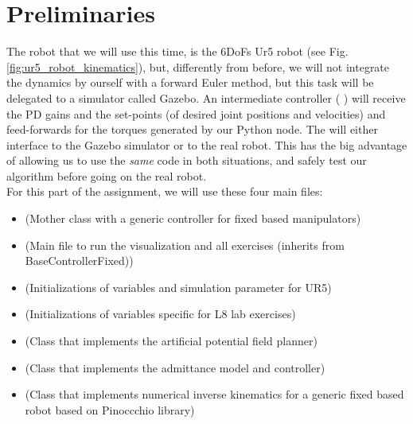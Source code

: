 \documentclass[11pt]{article}
\begin{document}
\section{Preliminaries}
	The robot that we will use this time, is the  6DoFs Ur5 robot (see Fig. \ref{fig:ur5_robot_kinematics}), but, differently from before, we will not integrate the dynamics by ourself with a forward Euler method,  but this task will be delegated to a simulator called Gazebo. An intermediate controller ( ) will receive the PD gains and the set-points (of desired joint positions and velocities) and feed-forwards for the torques generated by our Python node.
	The   will either interface to the  Gazebo simulator or to the real robot. This has the big advantage of  allowing us to use the \textit{same} code in both situations, and safely test our algorithm before going on the real robot.\\
	
	
	For this part of the assignment, we will use these four main files: 
	\begin{itemize}
		\item {} (Mother class with a generic controller for fixed based manipulators)
		\item {} (Main file to run the visualization and all exercises (inherits from BaseControllerFixed))
		\item {} (Initializations of variables and simulation parameter for UR5)
		\item {} (Initializations of variables specific for L8 lab exercises)
        \item {} (Class that implements the artificial potential field planner)
        \item {} (Class that implements the admittance model and controller)
        \item {} (Class that implements numerical inverse kinematics for a generic fixed based robot based on Pinoccchio library)
	\end{itemize}
	
\end{document}
